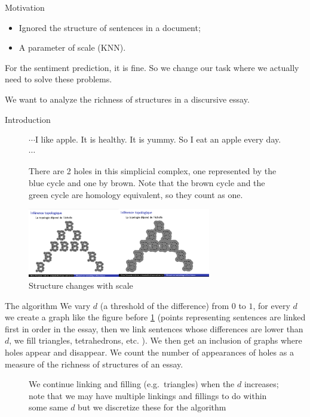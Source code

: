 \documentclass{beamer}
\begin{document}
\begin{frame}{Motivation}
\begin{itemize}
    \item Ignored the structure of sentences
in a document;
    \item A parameter of scale (KNN).
\end{itemize}
For the sentiment prediction, it is fine. So we change our task 
where we actually need to solve these problems.

We want to analyze the richness of structures in a discursive essay.
\end{frame}

\begin{frame}{Introduction}
\begin{figure}[H]
  \begin{minipage}{0.49\textwidth}
  \scalebox{0.45}{}
  \end{minipage}
  \begin{minipage}{0.49\textwidth}
  $\cdots$I like apple. It is healthy. It is yummy. So I eat an apple every day.
  $\cdots$
  \end{minipage}
  \caption{There are 2 holes in this simplicial complex,
  one represented by the blue cycle and one by brown.
  Note that the brown cycle and the green cycle are homology equivalent, so they count as one.}
  \label{apple}
\end{figure}
\begin{figure}[H]
\centering
\begin{minipage}[c]{0.77\textwidth}
\includegraphics[width=8cm]{scale.png}
\end{minipage}\hfill
\begin{minipage}{0.2\textwidth}
\caption{Structure changes with scale}
\end{minipage}
\end{figure}
\end{frame}

\begin{frame}{The algorithm}
We vary $d$ (a threshold of the difference) from $0$ to $1$, for every $d$ we create a graph like the figure before \ref{apple}
(points representing sentences are linked first in order in the essay,
then we link sentences whose differences are lower than $d$,
we fill triangles, tetrahedrons, etc. ). We then get an inclusion of graphs where holes appear and disappear. We count the number of appearances of holes as a measure of the richness of structures of an essay.
\begin{figure}[H]
\centering

\caption{We continue linking and filling (e.g.\ triangles) when the $d$ increases; note that
we may have multiple linkings and fillings to do within some same $d$ but we discretize these
for the algorithm}
\label{filtration}
\end{figure}
\end{frame}
\end{document}
